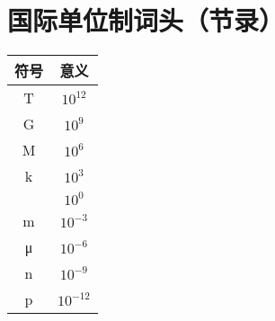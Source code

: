 \section{国际单位制词头（节录）}

\begin{longtable}{|c|c|}
	\hline
	\textbf{符号} & \textbf{意义} \\
	\hline
	T & $10^{12}$ \\
	\hline
	G & $10^{9}$ \\
	\hline
	M & $10^{6}$ \\
	\hline
	k & $10^{3}$ \\
	\hline
	 & $10^{0}$ \\
	\hline
	m & $10^{-3}$ \\
	\hline
	μ & $10^{-6}$ \\
	\hline
	n & $10^{-9}$ \\
	\hline
	p & $10^{-12}$ \\
	\hline
\end{longtable}

